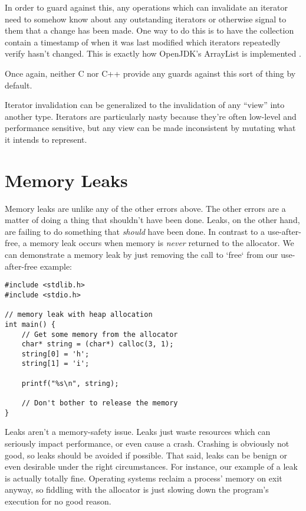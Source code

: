 In order to guard against this, any operations which can invalidate an iterator
need to somehow know about any outstanding iterators or otherwise signal to
them that a change has been made. One way to do this is to have the
collection contain a timestamp of when it was last modified which iterators
repeatedly verify hasn't changed. This is exactly how OpenJDK's ArrayList is
implemented \cite{jdkiter}.

Once again, neither C nor C++ provide any guards against this sort of thing
by default.

Iterator invalidation can be generalized to the invalidation of any ``view''
into another type. Iterators are particularly nasty because they're often
low-level and performance sensitive, but any view can be made
inconsistent by mutating what it intends to represent.




\section{Memory Leaks}

Memory leaks are unlike any of the other errors above. The other errors are a matter
of doing a thing that shouldn't have been done. Leaks, on the other hand, are
failing to do something that \emph{should} have been done. In contrast to a
use-after-free, a memory leak occurs when memory is \emph{never} returned to the allocator.
We can demonstrate a memory leak by just removing the call to `free` from our
use-after-free example:

\begin{verbatim}
#include <stdlib.h>
#include <stdio.h>

// memory leak with heap allocation
int main() {
    // Get some memory from the allocator
    char* string = (char*) calloc(3, 1);
    string[0] = 'h';
    string[1] = 'i';

    printf("%s\n", string);

    // Don't bother to release the memory
}
\end{verbatim}

Leaks aren't a memory-safety issue. Leaks just waste resources which can
seriously impact performance, or even cause a crash. Crashing is obviously not
good, so leaks should be avoided if possible. That said, leaks can be benign or
even desirable under the right circumstances. For instance, our example of a
leak is actually totally fine. Operating systems reclaim a process' memory on
exit anyway, so fiddling with the allocator is just slowing down the program's
execution for no good reason.

